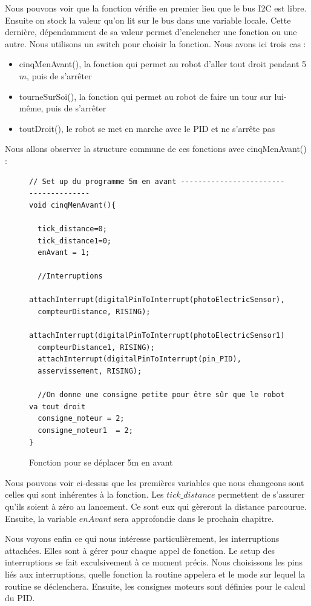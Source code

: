 \documentclass[
	a4paper,									%
	11pt,										%
	twoside,									%
	openright,									%
	notitlepage,									%
	parskip=half,								%
]{scrreprt}										%
\begin{document}
Nous pouvons voir que la fonction vérifie en premier lieu que le bus I2C est libre. Ensuite on stock la valeur 
qu'on lit sur le bus dans une variable locale. Cette dernière, dépendamment de sa valeur permet d'enclencher 
une fonction ou une autre. Nous utilisons un switch pour choisir la fonction. Nous avons ici trois cas :

\begin{itemize}
	\item cinqMenAvant(), la fonction qui permet au robot d'aller tout droit pendant 5$m$, puis de s'arrêter
 	\item tourneSurSoi(), la fonction qui permet au robot de faire un tour sur lui-même, puis de s'arrêter
  	\item toutDroit(), le robot se met en marche avec le PID et ne s'arrête pas
\end{itemize}

\noindent Nous allons observer la structure commune de ces fonctions avec cinqMenAvant() : 
\newpage
\begin{figure}[!ht]
	
	\begin{verbatim}
// Set up du programme 5m en avant --------------------------------------
void cinqMenAvant(){
  
  tick_distance=0;
  tick_distance1=0;
  enAvant = 1;

  //Interruptions 
  attachInterrupt(digitalPinToInterrupt(photoElectricSensor), 
  compteurDistance, RISING);
  attachInterrupt(digitalPinToInterrupt(photoElectricSensor1), 
  compteurDistance1, RISING);
  attachInterrupt(digitalPinToInterrupt(pin_PID), 
  asservissement, RISING);

  //On donne une consigne petite pour être sûr que le robot va tout droit
  consigne_moteur = 2;
  consigne_moteur1  = 2;
}
	\end{verbatim}
	\caption{Fonction pour se déplacer 5m en avant}
	\label{cinqMenAvant}
	\end{figure}
Nous pouvons voir ci-dessus que les premières variables que nous changeons sont celles qui sont inhérentes
à la fonction. Les $tick\_distance$ permettent de s'assurer qu'ils soient à zéro au lancement. Ce sont eux qui gèreront
la distance parcourue. Ensuite, la variable $enAvant$ sera approfondie dans le prochain chapitre. \par

Nous voyons enfin ce qui nous intéresse particulièrement, les interruptions attachées. Elles sont à gérer pour
chaque appel de fonction. Le setup des interruptions se fait exculsivement à ce moment précis. Nous choisissons 
les pins liés aux interruptions, quelle fonction la routine appelera et le mode sur lequel la routine se déclenchera. 
Ensuite, les consignes moteurs sont définies pour le calcul du PID. \par
\end{document}
